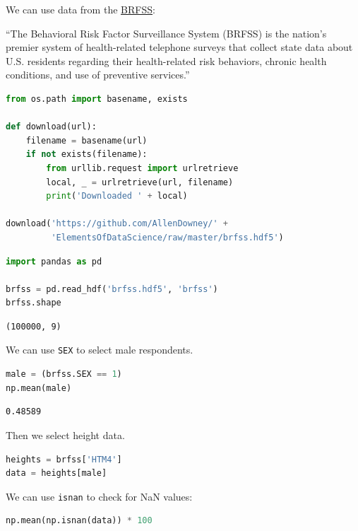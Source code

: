 We can use data from the
\href{https://www.cdc.gov/brfss/index.html}{BRFSS}:

``The Behavioral Risk Factor Surveillance System (BRFSS) is the nation's
premier system of health-related telephone surveys that collect state
data about U.S. residents regarding their health-related risk behaviors,
chronic health conditions, and use of preventive services.''

\begin{lstlisting}[language=Python,style=source]
from os.path import basename, exists

def download(url):
    filename = basename(url)
    if not exists(filename):
        from urllib.request import urlretrieve
        local, _ = urlretrieve(url, filename)
        print('Downloaded ' + local)
    
download('https://github.com/AllenDowney/' +
         'ElementsOfDataScience/raw/master/brfss.hdf5')
\end{lstlisting}

\begin{lstlisting}[language=Python,style=source]
import pandas as pd

brfss = pd.read_hdf('brfss.hdf5', 'brfss')
brfss.shape
\end{lstlisting}

\begin{lstlisting}[style=output]
(100000, 9)
\end{lstlisting}

We can use \passthrough{\lstinline!SEX!} to select male respondents.

\begin{lstlisting}[language=Python,style=source]
male = (brfss.SEX == 1)
np.mean(male)
\end{lstlisting}

\begin{lstlisting}[style=output]
0.48589
\end{lstlisting}

Then we select height data.

\begin{lstlisting}[language=Python,style=source]
heights = brfss['HTM4']
data = heights[male]
\end{lstlisting}

We can use \passthrough{\lstinline!isnan!} to check for NaN values:

\begin{lstlisting}[language=Python,style=source]
np.mean(np.isnan(data)) * 100
\end{lstlisting}

